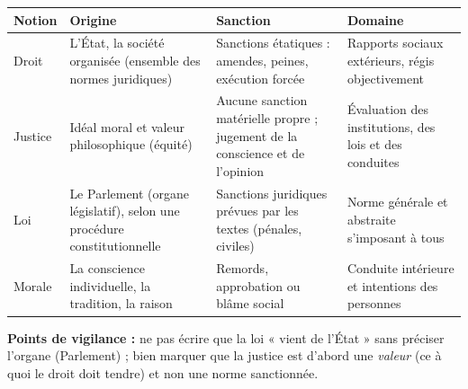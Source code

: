 \documentclass[11pt]{article}
\begin{document}
\begin{corrige}
\begin{center}
\begin{tabularx}{\linewidth}{|l|X|X|X|}\hline
\rowcolor{popblueL} \textbf{Notion} & \textbf{Origine} & \textbf{Sanction} & \textbf{Domaine} \\ \hline
Droit & L'État, la société organisée (ensemble des normes juridiques) & Sanctions étatiques : amendes, peines, exécution forcée & Rapports sociaux extérieurs, régis objectivement \\ \hline
Justice & Idéal moral et valeur philosophique (équité) & Aucune sanction matérielle propre ; jugement de la conscience et de l'opinion & Évaluation des institutions, des lois et des conduites \\ \hline
Loi & Le Parlement (organe législatif), selon une procédure constitutionnelle & Sanctions juridiques prévues par les textes (pénales, civiles) & Norme générale et abstraite s'imposant à tous \\ \hline
Morale & La conscience individuelle, la tradition, la raison & Remords, approbation ou blâme social & Conduite intérieure et intentions des personnes \\ \hline
\end{tabularx}
\end{center}
\textbf{Points de vigilance :} ne pas écrire que la loi « vient de l'État » sans préciser l'organe (Parlement) ; bien marquer que la justice est d'abord une \emph{valeur} (ce à quoi le droit doit tendre) et non une norme sanctionnée.
\end{corrige}
\end{document}
